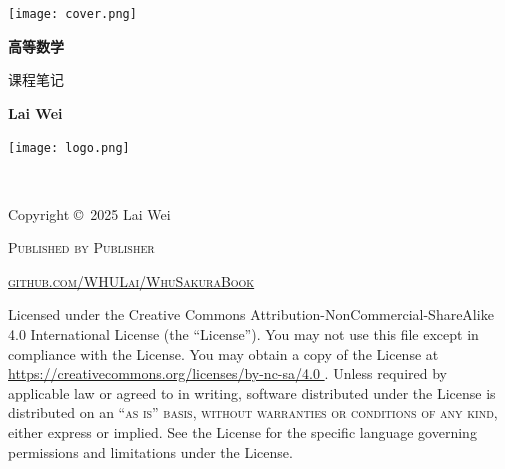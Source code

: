 \documentclass[
	11pt, %
	a4paper, %
]{WhuSakuraBook}
\begin{document}

\titlepage %
    {\texttt{[image: cover.png]}} %
    { %
        \centering\sffamily %
        {\Huge\bfseries 高等数学\par} %
        \vspace{12pt} %
        {\LARGE 课程笔记\par} %
        \vspace{20pt} %
        {\huge\bfseries Lai Wei\par} %
        \vspace{36pt} %
        {\texttt{[image: logo.png]}\par}
    }


\thispagestyle{empty} %

~\vfill %

\noindent Copyright \copyright\ 2025 Lai Wei
\vspace{1em}

\noindent \textsc{Published by Publisher}
\vspace{1em}

\noindent \textsc{\href{https://github.com/WHULai/WhuSakuraBook }{github.com/WHULai/WhuSakuraBook}}
\vspace{1em}

\noindent Licensed under the Creative Commons Attribution-NonCommercial-ShareAlike 4.0
International License (the ``License''). You may not use this file except in compliance with the License.
You may obtain a copy of the License at \url{https://creativecommons.org/licenses/by-nc-sa/4.0 }.
Unless required by applicable law or agreed to in writing,
software distributed under the License is distributed on an \textsc{``as is'' basis,
without warranties or conditions of any kind}, either express or implied.
See the License for the specific language governing permissions and limitations under the License.
\vspace{1em}
\end{document}
